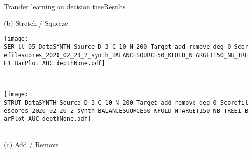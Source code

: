 \begin{frame}{Transfer learning on decision tree}{Results}
\begin{minipage}[t]{0.33\linewidth}
            \medskip
            {\small(b)\; Stretch / Squeeze}
        \end{minipage}
        \begin{minipage}[t]{0.33\linewidth}\vspace{0pt}
            \centering
            \begin{minipage}[t]{\ratio\linewidth}\vspace{0pt}
            \centerline{\texttt{[image: SER\_ll\_05\_DataSYNTH\_Source\_D\_3\_C\_10\_N\_200\_Target\_add\_remove\_deg\_0\_Scorefilescores\_2020\_02\_20\_2\_synth\_BALANCESOURCE50\_KFOLD\_NTARGET150\_NB\_TREE1\_BarPlot\_AUC\_depthNone.pdf]}}
            \end{minipage}\\
            \begin{minipage}[t]{\ratio\linewidth}\vspace{0cm}
            \centerline{\texttt{[image: STRUT\_DataSYNTH\_Source\_D\_3\_C\_10\_N\_200\_Target\_add\_remove\_deg\_0\_Scorefilescores\_2020\_02\_20\_2\_synth\_BALANCESOURCE50\_KFOLD\_NTARGET150\_NB\_TREE1\_BarPlot\_AUC\_depthNone.pdf]}}
            \end{minipage}\\
            \medskip
            {\small(c)\; Add / Remove}
        \end{minipage}

    
\end{frame}

